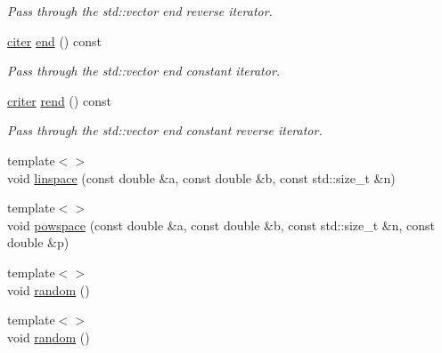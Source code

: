 \begin{DoxyCompactItemize}
\begin{DoxyCompactList}\small\item\em Pass through the std\+::vector end reverse iterator. \end{DoxyCompactList}\item 
\hyperlink{classLuna_1_1Vector_a90cff5eab2782bc1c6aaa879ce18a2b8}{citer} \hyperlink{classLuna_1_1Vector_aeb718e0c6a0d8cc3687481d544867f95}{end} () const
\begin{DoxyCompactList}\small\item\em Pass through the std\+::vector end constant iterator. \end{DoxyCompactList}\item 
\hyperlink{classLuna_1_1Vector_a66e997f05169640055703449672be075}{criter} \hyperlink{classLuna_1_1Vector_a8be51612ac896a7c9fde8479332c6a91}{rend} () const
\begin{DoxyCompactList}\small\item\em Pass through the std\+::vector end constant reverse iterator. \end{DoxyCompactList}\item 
{\footnotesize template$<$$>$ }\\void \hyperlink{classLuna_1_1Vector_adfa42b44de71e22c33c11e1b64947043}{linspace} (const double \&a, const double \&b, const std\+::size\+\_\+t \&n)
\item 
{\footnotesize template$<$$>$ }\\void \hyperlink{classLuna_1_1Vector_a3661efcaa52933187623fae94602f21b}{powspace} (const double \&a, const double \&b, const std\+::size\+\_\+t \&n, const double \&p)
\item 
{\footnotesize template$<$$>$ }\\void \hyperlink{classLuna_1_1Vector_a0a853cbc32fbc152c90b08f37aa14a10}{random} ()
\item 
{\footnotesize template$<$$>$ }\\void \hyperlink{classLuna_1_1Vector_ada5c7a79b4011f3cae60ae198a6c240a}{random} ()
\end{DoxyCompactItemize}
